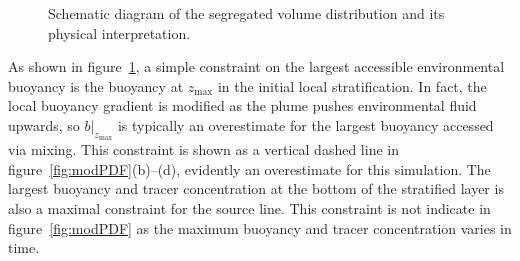\documentclass[a4paper]{article}
\begin{document}
\begin{figure}
	\centering
	\caption{Schematic diagram of the segregated volume distribution and its physical interpretation.}
	\label{fig:PDFschematic}
\end{figure}

As shown in figure~\ref{fig:PDFschematic}, a simple constraint on the largest accessible environmental
buoyancy is the buoyancy at $z_{\max}$ in the initial local stratification.  In fact, the local buoyancy
gradient is modified as the plume pushes environmental fluid upwards, so $\left.b\right|_{z_{\max}}$ is
typically an overestimate for the largest buoyancy accessed via mixing. This constraint is shown as a
vertical dashed line in figure~\ref{fig:modPDF}(b)--(d), evidently an overestimate for this simulation.
The largest buoyancy and tracer concentration at the bottom of the stratified layer is also a maximal
constraint for the source line. This constraint is not indicate in figure~\ref{fig:modPDF} as the maximum
buoyancy and tracer concentration varies in time. 
\end{document}
